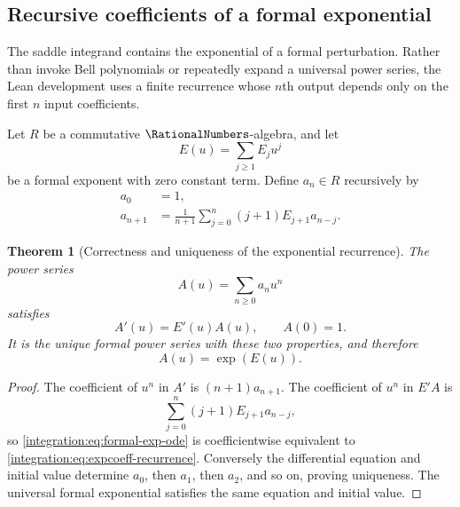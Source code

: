 \documentclass[11pt,oneside]{article}
\newtheorem{theorem}{Theorem}[section]
\theoremstyle{definition}
\theoremstyle{remark}
\begin{document}
\subsection{Recursive coefficients of a formal exponential}
\label{integration:sec:exp-coeff}

The saddle integrand contains the exponential of a formal perturbation.  Rather than invoke
Bell polynomials or repeatedly expand a universal power series, the Lean development uses a
finite recurrence whose $n$th output depends only on the first $n$ input coefficients.

Let $R$ be a commutative $\RationalNumbers$-algebra, and let
\begin{equation}
 E(u)=\sum_{j\ge1}E_j u^j
 \label{integration:eq:formal-exponent}
\end{equation}
be a formal exponent with zero constant term.  Define $a_n\in R$ recursively by
\begin{align}
 a_0&=1,                                                    \label{integration:eq:expcoeff-zero}\\
 a_{n+1}&=\frac1{n+1}\sum_{j=0}^{n}(j+1)E_{j+1}a_{n-j}.
                                                               \label{integration:eq:expcoeff-recurrence}
\end{align}

\begin{theorem}[Correctness and uniqueness of the exponential recurrence]
\label{integration:thm:expcoeff-correctness}
The power series
\begin{equation}
 A(u)=\sum_{n\ge0}a_nu^n
 \label{integration:eq:formal-mass-series}
\end{equation}
satisfies
\begin{equation}
 A'(u)=E'(u)A(u),
 \qquad
 A(0)=1.
 \label{integration:eq:formal-exp-ode}
\end{equation}
It is the unique formal power series with these two properties, and therefore
\begin{equation}
 A(u)=\exp(E(u)).
 \label{integration:eq:formal-exp-identification}
\end{equation}
\end{theorem}

\begin{proof}
The coefficient of $u^n$ in $A'$ is $(n+1)a_{n+1}$.  The coefficient of $u^n$ in $E'A$ is
\[
 \sum_{j=0}^{n}(j+1)E_{j+1}a_{n-j},
\]
so \eqref{integration:eq:formal-exp-ode} is coefficientwise equivalent to
\eqref{integration:eq:expcoeff-recurrence}.  Conversely the differential equation and initial value
determine $a_0$, then $a_1$, then $a_2$, and so on, proving uniqueness.  The universal
formal exponential satisfies the same equation and initial value.
\end{proof}
\end{document}
